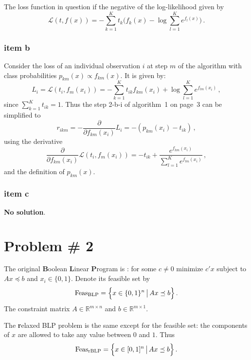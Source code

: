 \documentclass[a4paper]{article}
\newcommand{\Real}{\mathbb{R}}
\newcommand{\Lcal}{\mathcal{L}}
\begin{document}
The loss function in question if the negative of the log-likelihood given by
\[
\Lcal(t, f(x)) = - \sum_{k=1}^K t_k \bigl( f_k(x) - \log \sum_{l=1}^K e^{f_l(x)} \bigr)\,.
\]


\subsubsection{item b} %
\label{ssub:item_b}

Consider the loss of an individual observation $i$ at step $m$ of the algorithm
with class probabilities $p_{km}(x)\propto f_{km}(x)$. It is given by:
\[
L_i = \Lcal(t_i, f_m(x_i)) 
= - \sum_{k=1}^K t_{ik} f_{km}(x_i)
+ \log \sum_{l=1}^K e^{f_{lm}(x_i)}\,,
\]
since $\sum_{k=1}^K t_{ik}=1$. Thus the step 2-b-i of algorithm~1 on page~3 can be
simplified to
\[
r_{ikm} = - \frac{\partial }{\partial f_{km}(x_i)} L_i = -( p_{km}(x_i) - t_{ik} )\,,
\]
using the derivative 
\[
\frac{\partial }{\partial f_{km}(x_i)} \Lcal(t_i, f_m(x_i))
= - t_{ik} + \frac{e^{f_{km}(x_i)}}{\sum_{l=1}^K e^{f_{lm}(x_i)}}\,,
\]
and the definition of $p_{km}(x)$.


\subsubsection{item c} %
\label{ssub:item_c}

\textbf{No solution}.




\section{Problem \# 2} %
\label{sec:problem_2}

The original \textbf{B}oolean \textbf{L}inear \textbf{P}rogram is : for some $c\neq 0$
minimize $c'x$ subject to $Ax \preceq b$ and $x_i\in\{0,1\}$. Denote its feasible set by
\[ \text{Feas}_{\text{BLP}} = \Bigl\{ x \in \{0,1\}^n \,\big|\, Ax \preceq b \Bigr\} \,. \]
The constraint matrix $A \in \Real^{m\times n}$ and $b \in \Real^{m\times 1}$.

The \textbf{r}elaxed BLP problem is the same except for the feasible set: the components
of $x$ are allowed to take any value between $0$ and $1$. Thus
\[ \text{Feas}_{\text{rBLP}} = \Bigl\{ x \in [0,1]^n \,\big|\, Ax \preceq b \Bigr\} \,. \]
\end{document}
